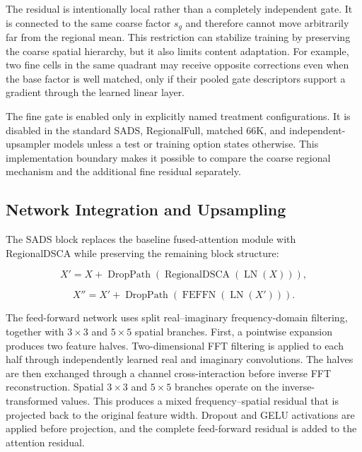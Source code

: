 \documentclass[10pt,twocolumn,letterpaper]{article}
\begin{document}
The residual is intentionally local rather than a completely independent gate. It is connected to the same coarse factor $s_g$ and therefore cannot move arbitrarily far from the regional mean. This restriction can stabilize training by preserving the coarse spatial hierarchy, but it also limits content adaptation. For example, two fine cells in the same quadrant may receive opposite corrections even when the base factor is well matched, only if their pooled gate descriptors support a gradient through the learned linear layer.

The fine gate is enabled only in explicitly named treatment configurations. It is disabled in the standard SADS, RegionalFull, matched 66K, and independent-upsampler models unless a test or training option states otherwise. This implementation boundary makes it possible to compare the coarse regional mechanism and the additional fine residual separately.

\subsection{Network Integration and Upsampling}

The SADS block replaces the baseline fused-attention module with RegionalDSCA while preserving the remaining block structure:

\begin{equation}
X' = X + \operatorname{DropPath}(\operatorname{RegionalDSCA}(\operatorname{LN}(X))),
\end{equation}

\begin{equation}
X'' = X' + \operatorname{DropPath}(\operatorname{FEFFN}(\operatorname{LN}(X'))).
\end{equation}

The feed-forward network uses split real--imaginary frequency-domain filtering, together with $3\times3$ and $5\times5$ spatial branches. First, a pointwise expansion produces two feature halves. Two-dimensional FFT filtering is applied to each half through independently learned real and imaginary convolutions. The halves are then exchanged through a channel cross-interaction before inverse FFT reconstruction. Spatial $3\times3$ and $5\times5$ branches operate on the inverse-transformed values. This produces a mixed frequency--spatial residual that is projected back to the original feature width. Dropout and GELU activations are applied before projection, and the complete feed-forward residual is added to the attention residual.
\end{document}
